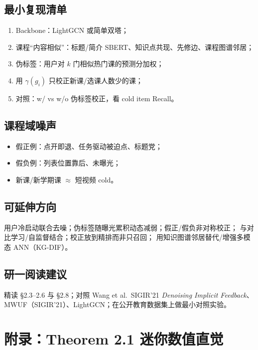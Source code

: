 \documentclass[11pt,a4paper]{ctexart}
\begin{document}
\subsection{最小复现清单}
\begin{enumerate}
  \item Backbone：LightGCN 或简单双塔；
  \item 课程“内容相似”：标题/简介 SBERT、知识点共现、先修边、课程图谱邻居；
  \item 伪标签：用户对 $k$ 门相似热门课的预测分加权；
  \item 用 $\gamma(g_i)$ 只校正新课/选课人数少的课；
  \item 对照：w/ vs w/o 伪标签校正，看 cold item Recall。
\end{enumerate}

\subsection{课程域噪声}
\begin{itemize}
  \item 假正例：点开即退、任务驱动被迫点、标题党；
  \item 假负例：列表位置靠后、未曝光；
  \item 新课/新学期课 $\approx$ 短视频 cold。
\end{itemize}

\subsection{可延伸方向}
用户冷启动联合去噪；伪标签随曝光累积动态减弱；假正/假负非对称校正；
与对比学习/自监督结合；校正放到精排而非只召回；
用知识图谱邻居替代/增强多模态 ANN（KG-DIF）。

\subsection{研一阅读建议}
精读 §2.3--2.6 与 §2.8；对照 Wang et al.\ SIGIR'21 \textit{Denoising Implicit Feedback}、
MWUF（SIGIR'21）、LightGCN；在公开教育数据集上做最小对照实验。

\section{附录：Theorem 2.1 迷你数值直觉}
\end{document}

